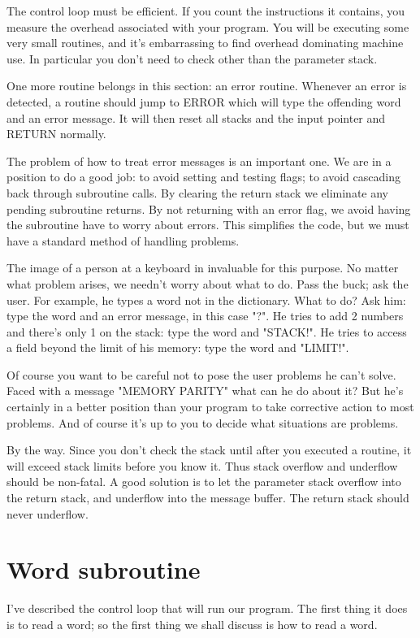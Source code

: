 \documentclass[b5paper, oneside]{book}
\begin{document}
The control loop must be efficient. If you count the instructions it contains, you measure the overhead associated with your program. You will be executing some very small routines, and it's embarrassing to find overhead dominating machine use. In particular you don't need to check other than the parameter stack.

One more routine belongs in this section: an error routine. Whenever an error is detected, a routine should jump to ERROR which will type the offending word and an error message. It will then reset all stacks and the input pointer and RETURN normally.

The problem of how to treat error messages is an important one. We are in a position to do a good job: to avoid setting and testing flags; to avoid cascading back through subroutine calls. By clearing the return stack we eliminate any pending subroutine returns. By not returning with an error flag, we avoid having the subroutine have to worry about errors. This simplifies the code, but we must have a standard method of handling problems.

The image of a person at a keyboard in invaluable for this purpose. No matter what problem arises, we needn't worry about what to do. Pass the buck; ask the user. For example, he types a word not in the dictionary. What to do? Ask him: type the word and an error message, in this case "?". He tries to add 2 numbers and there's only 1 on the stack: type the word and "STACK!". He tries to access a field beyond the limit of his memory: type the word and "LIMIT!".

Of course you want to be careful not to pose the user problems he can't solve. Faced with a message "MEMORY PARITY" what can he do about it? But he's certainly in a better position than your program to take corrective action to most problems. And of course it's up to you to decide what situations are problems.

By the way. Since you don't check the stack until after you executed a routine, it will exceed stack limits before you know it. Thus stack overflow and underflow should be non-fatal. A good solution is to let the parameter stack overflow into the return stack, and underflow into the message buffer. The return stack should never underflow.

\section{Word subroutine}
I've described the control loop that will run our program. The first thing it does is to read a word; so the first thing we shall discuss is how to read a word.
\end{document}
